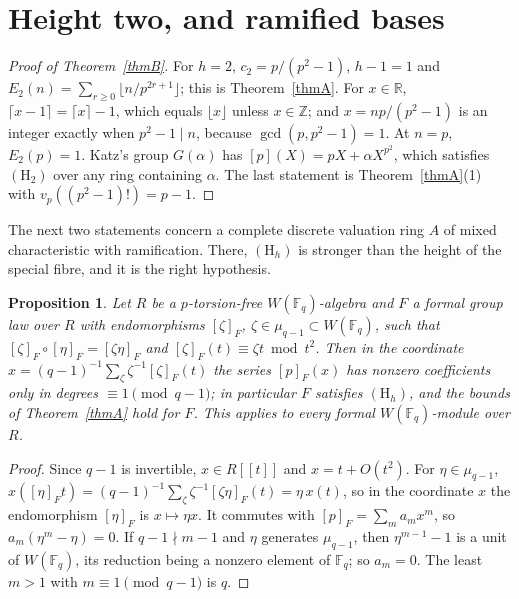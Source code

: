 \documentclass[11pt]{amsart}
\newtheorem{proposition}[thm]{Proposition}
\theoremstyle{definition}
\theoremstyle{remark}
\newcommand{\Z}{\mathbb Z}
\newcommand{\F}{\mathbb F}
\newcommand{\vp}{v_p}
\begin{document}
\section{Height two, and ramified bases}\label{sec:ramified}

\begin{proof}[Proof of Theorem~\ref{thmB}]
For $h=2$, $c_2=p/(p^2-1)$, $h-1=1$ and $E_2(n)=\sum_{r\ge0}\lfloor n/p^{2r+1}\rfloor$; this is Theorem~\ref{thmA}. For $x\in\mathbb R$, $\lceil x-1\rceil=\lceil x\rceil-1$, which equals $\lfloor x\rfloor$ unless $x\in\Z$; and $x=np/(p^2-1)$ is an integer exactly when $p^2-1\mid n$, because $\gcd(p,p^2-1)=1$. At $n=p$, $E_2(p)=1$. Katz's group $G(\alpha)$ has $[p](X)=pX+\alpha X^{p^2}$, which satisfies $(\mathrm H_2)$ over any ring containing $\alpha$. The last statement is Theorem~\ref{thmA}(1) with $\vp((p^2-1)!)=p-1$.
\end{proof}

The next two statements concern a complete discrete valuation ring $A$ of mixed characteristic with ramification. There, $(\mathrm H_h)$ is stronger than the height of the special fibre, and it is the right hypothesis.

\begin{proposition}\label{prop:teich}
Let $R$ be a $p$-torsion-free $W(\F_q)$-algebra and $F$ a formal group law over $R$ with endomorphisms $[\zeta]_F$, $\zeta\in\mu_{q-1}\subset W(\F_q)$, such that $[\zeta]_F\circ[\eta]_F=[\zeta\eta]_F$ and $[\zeta]_F(t)\equiv\zeta t\bmod t^2$. Then in the coordinate $x=(q-1)^{-1}\sum_{\zeta}\zeta^{-1}[\zeta]_F(t)$ the series $[p]_F(x)$ has nonzero coefficients only in degrees $\equiv1\pmod{q-1}$; in particular $F$ satisfies $(\mathrm H_h)$, and the bounds of Theorem~\ref{thmA} hold for $F$. This applies to every formal $W(\F_q)$-module over $R$.
\end{proposition}

\begin{proof}
Since $q-1$ is invertible, $x\in R[[t]]$ and $x=t+O(t^2)$. For $\eta\in\mu_{q-1}$, $x([\eta]_Ft)=(q-1)^{-1}\sum_\zeta\zeta^{-1}[\zeta\eta]_F(t)=\eta\,x(t)$, so in the coordinate $x$ the endomorphism $[\eta]_F$ is $x\mapsto\eta x$. It commutes with $[p]_F=\sum_ma_mx^m$, so $a_m(\eta^m-\eta)=0$. If $q-1\nmid m-1$ and $\eta$ generates $\mu_{q-1}$, then $\eta^{m-1}-1$ is a unit of $W(\F_q)$, its reduction being a nonzero element of $\F_q$; so $a_m=0$. The least $m>1$ with $m\equiv1\pmod{q-1}$ is $q$.
\end{proof}
\end{document}
